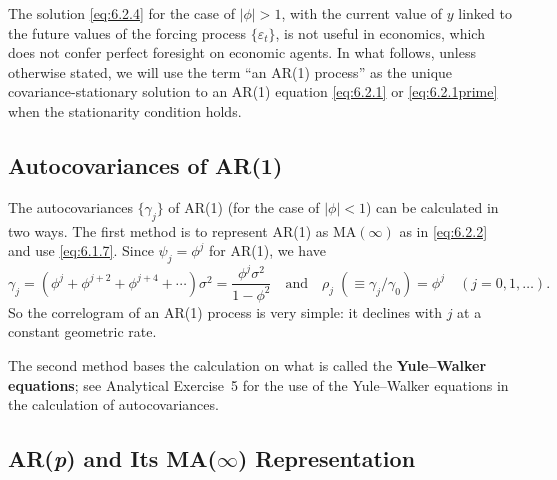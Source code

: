 The solution \eqref{eq:6.2.4} for the case of $|\phi| > 1$, with the current value of $y$ linked
to the future values of the forcing process $\{\varepsilon_t\}$, is not useful in economics, which
does not confer perfect foresight on economic agents. In what follows, unless otherwise
stated, we will use the term ``an AR(1) process'' as the unique covariance-stationary
solution to an AR(1) equation \eqref{eq:6.2.1} or \eqref{eq:6.2.1prime} when the stationarity
condition holds.

\subsection*{Autocovariances of AR(1)}

The autocovariances $\{\gamma_j\}$ of AR(1) (for the case of $|\phi| < 1$) can be calculated in
two ways. The first method is to represent AR(1) as $\text{MA}(\infty)$ as in \eqref{eq:6.2.2} and use
\eqref{eq:6.1.7}. Since $\psi_j = \phi^j$ for AR(1), we have
\begin{equation}
  \gamma_j = (\phi^j + \phi^{j+2} + \phi^{j+4} + \cdots) \sigma^2
         = \frac{\phi^j \sigma^2}{1 - \phi^2}
  \quad \text{and} \quad
  \rho_j \;(\equiv \gamma_j / \gamma_0) = \phi^j
  \quad (j = 0, 1, \ldots).
  \label{eq:6.2.5}
\end{equation}
So the correlogram of an AR(1) process is very simple: it declines with $j$ at a
constant geometric rate.

The second method bases the calculation on what is called the \textbf{Yule--Walker
equations}; see Analytical Exercise~5 for the use of the Yule--Walker equations in
the calculation of autocovariances.

\subsection*{AR(\textit{p}) and Its MA($\infty$) Representation}


